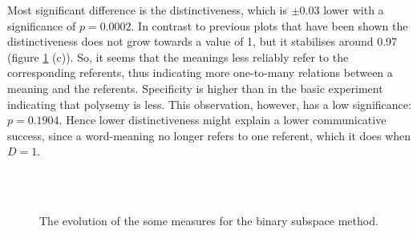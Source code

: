 \begin{description}
Most significant difference is the distinctiveness, which is $\pm 0.03$ lower with a significance of $p=0.0002$. In contrast to previous plots that have been shown the distinctiveness does not grow towards a value of 1, but it stabilises around 0.97 (figure \ref{f:cat:bin} (c)). So, it seems that the meanings less reliably refer to the corresponding referents, thus indicating more one-to-many relations between a meaning and the referents. Specificity is higher than in the basic experiment indicating that polysemy is less. This observation, however, has a low significance: $p=0.1904$. Hence lower distinctiveness might explain a lower communicative success, since a word-meaning no longer refers to one referent, which it does when $D=1$.
\end{description}

\begin{figure}[t]
\centering
{}
\\
\\
\caption{The evolution of the some measures for the binary subspace method.}
\label{f:cat:bin}
\end{figure}

